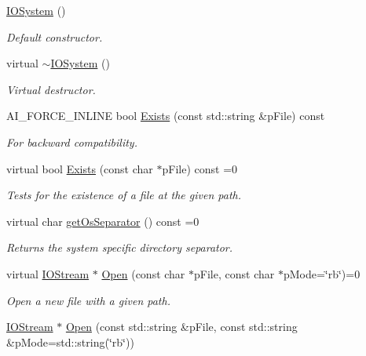 \begin{DoxyCompactItemize}
\item 
\hyperlink{class_assimp_1_1_i_o_system_af8ba1ee2dc0686da8fc9e3dad49af801}{I\-O\-System} ()
\begin{DoxyCompactList}\small\item\em Default constructor. \end{DoxyCompactList}\item 
virtual \hyperlink{class_assimp_1_1_i_o_system_a617417f1c5125770606fea3b41068b36}{$\sim$\-I\-O\-System} ()
\begin{DoxyCompactList}\small\item\em Virtual destructor. \end{DoxyCompactList}\item 
A\-I\-\_\-\-F\-O\-R\-C\-E\-\_\-\-I\-N\-L\-I\-N\-E bool \hyperlink{class_assimp_1_1_i_o_system_a7ae6cfaea4957408967463bfc3b84b27}{Exists} (const std\-::string \&p\-File) const 
\begin{DoxyCompactList}\small\item\em For backward compatibility. \end{DoxyCompactList}\item 
virtual bool \hyperlink{class_assimp_1_1_i_o_system_a79f5fe8d2dbe1056c9418f7de9a72445}{Exists} (const char $\ast$p\-File) const =0
\begin{DoxyCompactList}\small\item\em Tests for the existence of a file at the given path. \end{DoxyCompactList}\item 
virtual char \hyperlink{class_assimp_1_1_i_o_system_a40e412875b985bdb638f00ef0f20fff6}{get\-Os\-Separator} () const =0
\begin{DoxyCompactList}\small\item\em Returns the system specific directory separator. \end{DoxyCompactList}\item 
virtual \hyperlink{class_assimp_1_1_i_o_stream}{I\-O\-Stream} $\ast$ \hyperlink{class_assimp_1_1_i_o_system_ac512ece3b0701de5682553007a4c0816}{Open} (const char $\ast$p\-File, const char $\ast$p\-Mode=\char`\"{}rb\char`\"{})=0
\begin{DoxyCompactList}\small\item\em Open a new file with a given path. \end{DoxyCompactList}\item 
\hyperlink{class_assimp_1_1_i_o_stream}{I\-O\-Stream} $\ast$ \hyperlink{class_assimp_1_1_i_o_system_aef35fabc9bd49fb83bfd4f12a94083c3}{Open} (const std\-::string \&p\-File, const std\-::string \&p\-Mode=std\-::string(\char`\"{}rb\char`\"{}))

\end{DoxyCompactItemize}
